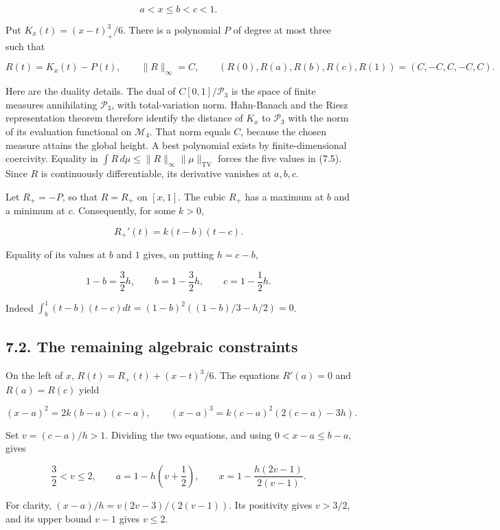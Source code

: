 \documentclass[11pt]{article}
\begin{document}
\[
a<x\le b<c<1.
\tag{7.4}
\]

Put \(K_x(t)=(x-t)_+^3/6\). There is a polynomial \(P\) of degree at
most three such that

\[
R(t)=K_x(t)-P(t),\qquad
\|R\|_\infty=C,\qquad
(R(0),R(a),R(b),R(c),R(1))=(C,-C,C,-C,C).
\tag{7.5}
\]

Here are the duality details. The dual of \(C[0,1]/\mathcal P_3\) is the
space of finite measures annihilating \(\mathcal P_3\), with
total-variation norm. Hahn-Banach and the Riesz representation theorem
therefore identify the distance of \(K_x\) to \(\mathcal P_3\) with the
norm of its evaluation functional on \(\mathcal M_4\). That norm equals
\(C\), because the chosen measure attains the global height. A best
polynomial exists by finite-dimensional coercivity. Equality in
\(\int R\,d\mu\le\|R\|_\infty\|\mu\|_{\mathrm{TV}}\) forces the five
values in (7.5). Since \(R\) is continuously differentiable, its
derivative vanishes at \(a,b,c\).

Let \(R_+=-P\), so that \(R=R_+\) on \([x,1]\). The cubic \(R_+\) has a
maximum at \(b\) and a minimum at \(c\). Consequently, for some \(k>0\),

\[
R_+'(t)=k(t-b)(t-c).
\tag{7.6}
\]

Equality of its values at \(b\) and \(1\) gives, on putting \(h=c-b\),

\[
1-b=\frac32h,\qquad
b=1-\frac32h,\qquad c=1-\frac12h.
\tag{7.7}
\]

Indeed \(\int_b^1(t-b)(t-c)dt=(1-b)^2((1-b)/3-h/2)=0\).

\subsection{7.2. The remaining algebraic
constraints}\label{the-remaining-algebraic-constraints}

On the left of \(x\), \(R(t)=R_+(t)+(x-t)^3/6\). The equations
\(R'(a)=0\) and \(R(a)=R(c)\) yield

\[
(x-a)^2=2k(b-a)(c-a),\qquad
(x-a)^3=k(c-a)^2(2(c-a)-3h).
\tag{7.8}
\]

Set \(v=(c-a)/h>1\). Dividing the two equations, and using
\(0<x-a\le b-a\), gives

\[
\frac32<v\le2,\qquad
 a=1-h\left(v+\frac12\right),\qquad
 x=1-\frac{h(2v-1)}{2(v-1)}.
\tag{7.9}
\]

For clarity, \((x-a)/h=v(2v-3)/(2(v-1))\). Its positivity gives
\(v>3/2\), and its upper bound \(v-1\) gives \(v\le2\).
\end{document}
